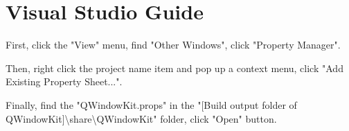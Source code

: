 \chapter{Visual Studio Guide}
\hypertarget{md_third__party_2qwindowkit_2docs_2visual-studio-guide}{}\label{md_third__party_2qwindowkit_2docs_2visual-studio-guide}
\label{md_third__party_2qwindowkit_2docs_2visual-studio-guide_autotoc_md10}%
%
 

First, click the "{}\+View"{} menu, find "{}\+Other Windows"{}, click "{}\+Property Manager"{}.



Then, right click the project name item and pop up a context menu, click "{}\+Add \+Existing Property Sheet..."{}.



Finally, find the "{}\+QWindow\+Kit.\+props"{} in the "{}\mbox{[}\+Build output folder of \+QWindow\+Kit\mbox{]}\textbackslash{}share\textbackslash{}\+QWindow\+Kit"{} folder, click "{}\+Open"{} button. 